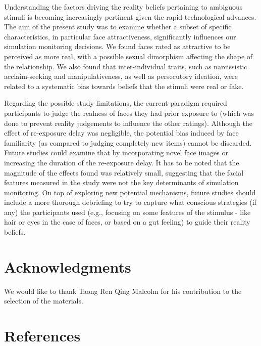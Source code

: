 \documentclass[
  man,floatsintext]{apa6}
\begin{document}
Understanding the factors driving the reality beliefs pertaining to ambiguous stimuli is becoming increasingly pertinent given the rapid technological advances. The aim of the present study was to examine whether a subset of specific characteristics, in particular face attractiveness, significantly influences our simulation monitoring decisions. We found faces rated as attractive to be perceived as more real, with a possible sexual dimorphism affecting the shape of the relationship. We also found that inter-individual traits, such as narcissistic acclaim-seeking and manipulativeness, as well as persecutory ideation, were related to a systematic bias towards beliefs that the stimuli were real or fake.

Regarding the possible study limitations, the current paradigm required participants to judge the realness of faces they had prior exposure to (which was done to prevent reality judgements to influence the other ratings). Although the effect of re-exposure delay was negligible, the potential bias induced by face familiarity (as compared to judging completely new items) cannot be discarded. Future studies could examine that by incorporating novel face images or increasing the duration of the re-exposure delay. It has to be noted that the magnitude of the effects found was relatively small, suggesting that the facial features measured in the study were not the key determinants of simulation monitoring. On top of exploring new potential mechanisms, future studies should include a more thorough debriefing to try to capture what conscious strategies (if any) the participants used (e.g., focusing on some features of the stimulus - like hair or eyes in the case of faces, or based on a gut feeling) to guide their reality beliefs.

\hypertarget{acknowledgments}{%
\section{Acknowledgments}\label{acknowledgments}}

We would like to thank Taong Ren Qing Malcolm for his contribution to the selection of the materials.

\newpage

\hypertarget{references}{%
\section{References}\label{references}}
\end{document}
